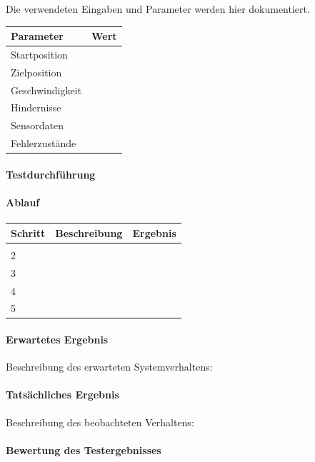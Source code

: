 Die verwendeten Eingaben und Parameter werden hier dokumentiert.

\begin{longtable}[]{@{}ll@{}}
\toprule\noalign{}
Parameter & Wert \\
\midrule\noalign{}
\endhead
\bottomrule\noalign{}
\endlastfoot
Startposition & \\
Zielposition & \\
Geschwindigkeit & \\
Hindernisse & \\
Sensordaten & \\
Fehlerzustände & \\
\end{longtable}

\paragraph{Testdurchführung}\label{testdurchfuxfchrung}

\paragraph{Ablauf}\label{ablauf-34}

\begin{longtable}[]{@{}lll@{}}
\toprule\noalign{}
Schritt & Beschreibung & Ergebnis \\
\midrule\noalign{}
\endhead
\bottomrule\noalign{}
\endlastfoot
1 & & \\
2 & & \\
3 & & \\
4 & & \\
5 & & \\
\end{longtable}

\paragraph{Erwartetes Ergebnis}\label{erwartetes-ergebnis-34}

Beschreibung des erwarteten Systemverhaltens:

\paragraph{Tatsächliches Ergebnis}\label{tatsuxe4chliches-ergebnis}

Beschreibung des beobachteten Verhaltens:

\paragraph{Bewertung des
Testergebnisses}\label{bewertung-des-testergebnisses}

